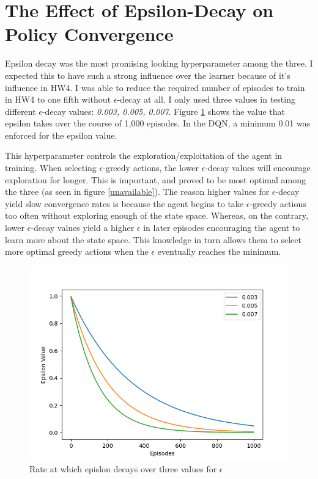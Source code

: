 \documentclass[conference]{IEEEtran}
\begin{document}
\section{The Effect of Epsilon-Decay on Policy Convergence}
Epsilon decay was the most promising looking hyperparameter among the three. I expected this to have such a strong influence over the learner because of it's influence in HW4. I was able to reduce the required number of episodes to train in HW4 to one fifth without $\epsilon$-decay at all. I only used three values in testing different $\epsilon$-decay values: \textit{0.003, 0.005, 0.007}. Figure \ref{fig:epsilon-decay} shows the value that epsilon takes over the course of 1,000 episodes. In the DQN, a minimum 0.01 was enforced for the epsilon value.

This hyperparameter controls the exploration/exploitation of the agent in training. When selecting $\epsilon$-greedy actions, the lower $\epsilon$-decay values will encourage exploration for longer. This is important, and proved to be most optimal among the three (as seen in figure \ref{unavailable}). The reason higher values for $\epsilon$-decay yield slow convergence rates is because the agent begins to take $\epsilon$-greedy actions too often without exploring enough of the state space. Whereas, on the contrary, lower $\epsilon$-decay values yield a higher $\epsilon$ in later episodes encouraging the agent to learn more about the state space. This knowledge in turn allows them to select more optimal greedy actions when the $\epsilon$ eventually reaches the minimum.

\begin{figure}[]
    \centering
    \includegraphics[scale=0.45]{figs/epsilon-decay}
    \caption{Rate at which epislon decays over three values for $\epsilon$}
    \label{fig:epsilon-decay}
\end{figure}
\end{document}
